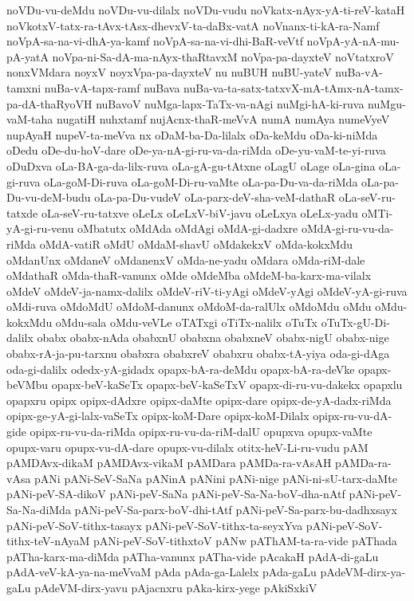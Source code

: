 {noVDu-vu-deMdu
noVDu-vu-dilalx
noVDu-vudu
noVkatx-nAyx-yA-ti-reV-kataH
noVkotxV-tatx-ra-tAvx-tAsx-dhevxV-ta-daBx-vatA
noVnanx-ti-kA-ra-Namf
noVpA-sa-na-vi-dhA-ya-kamf
noVpA-sa-na-vi-dhi-BaR-veVtf
noVpA-yA-nA-mu-pA-yatA
noVpa-ni-Sa-dA-ma-nAyx-thaRtavxM
noVpa-pa-dayxteV
noVtatxroV
nonxVMdara
noyxV
noyxVpa-pa-dayxteV
nu
nuBUH
nuBU-yateV
nuBa-vA-tamxni
nuBa-vA-tapx-ramf
nuBava
nuBa-va-ta-satx-tatxvX-mA-tAmx-nA-tamx-pa-dA-thaRyoVH
nuBavoV
nuMga-lapx-TaTx-va-nAgi
nuMgi-hA-ki-ruva
nuMgu-vaM-taha
nugatiH
nuhxtamf
nujAcnx-thaR-meVvA
numA
numAya
numeVyeV
nupAyaH
nupeV-ta-meVva
nx
oDaM-ba-Da-lilalx
oDa-keMdu
oDa-ki-niMda
oDedu
oDe-du-hoV-dare
oDe-ya-nA-gi-ru-va-da-riMda
oDe-yu-vaM-te-yi-ruva
oDuDxva
oLa-BA-ga-da-lilx-ruva
oLa-gA-gu-tAtxne
oLagU
oLage
oLa-gina
oLa-gi-ruva
oLa-goM-Di-ruva
oLa-goM-Di-ru-vaMte
oLa-pa-Du-va-da-riMda
oLa-pa-Du-vu-deM-budu
oLa-pa-Du-vudeV
oLa-parx-deV-sha-veM-dathaR
oLa-seV-ru-tatxde
oLa-seV-ru-tatxve
oLeLx
oLeLxV-biV-javu
oLeLxya
oLeLx-yadu
oMTi-yA-gi-ru-venu
oMbatutx
oMdAda
oMdAgi
oMdA-gi-dadxre
oMdA-gi-ru-vu-da-riMda
oMdA-vatiR
oMdU
oMdaM-shavU
oMdakekxV
oMda-kokxMdu
oMdanUnx
oMdaneV
oMdanenxV
oMda-ne-yadu
oMdara
oMda-riM-dale
oMdathaR
oMda-thaR-vanunx
oMde
oMdeMba
oMdeM-ba-karx-ma-vilalx
oMdeV
oMdeV-ja-namx-dalilx
oMdeV-riV-ti-yAgi
oMdeV-yAgi
oMdeV-yA-gi-ruva
oMdi-ruva
oMdoMdU
oMdoM-danunx
oMdoM-da-ralUlx
oMdoMdu
oMdu
oMdu-kokxMdu
oMdu-sala
oMdu-veVLe
oTATxgi
oTiTx-nalilx
oTuTx
oTuTx-gU-Di-dalilx
obabx
obabx-nAda
obabxnU
obabxna
obabxneV
obabx-nigU
obabx-nige
obabx-rA-ja-pu-tarxnu
obabxra
obabxreV
obabxru
obabx-tA-yiya
oda-gi-dAga
oda-gi-dalilx
odedx-yA-gidadx
opapx-bA-ra-deMdu
opapx-bA-ra-deVke
opapx-beVMbu
opapx-beV-kaSeTx
opapx-beV-kaSeTxV
opapx-di-ru-vu-dakekx
opapxlu
opapxru
opipx
opipx-dAdxre
opipx-daMte
opipx-dare
opipx-de-yA-dadx-riMda
opipx-ge-yA-gi-lalx-vaSeTx
opipx-koM-Dare
opipx-koM-Dilalx
opipx-ru-vu-dA-gide
opipx-ru-vu-da-riMda
opipx-ru-vu-da-riM-dalU
opupxva
opupx-vaMte
opupx-varu
opupx-vu-dA-dare
opupx-vu-dilalx
otitx-heV-Li-ru-vudu
pAM
pAMDAvx-dikaM
pAMDAvx-vikaM
pAMDara
pAMDa-ra-vAsAH
pAMDa-ra-vAsa
pANi
pANi-SeV-SaNa
pANinA
pANini
pANi-nige
pANi-ni-sU-tarx-daMte
pANi-peV-SA-dikoV
pANi-peV-SaNa
pANi-peV-Sa-Na-boV-dha-nAtf
pANi-peV-Sa-Na-diMda
pANi-peV-Sa-parx-boV-dhi-tAtf
pANi-peV-Sa-parx-bu-dadhxsayx
pANi-peV-SoV-tithx-tasayx
pANi-peV-SoV-tithx-ta-seyxYva
pANi-peV-SoV-tithx-teV-nAyaM
pANi-peV-SoV-tithxtoV
pANw
pAThAM-ta-ra-vide
pAThada
pATha-karx-ma-diMda
pATha-vanunx
pATha-vide
pAcakaH
pAdA-di-gaLu
pAdA-veV-kA-ya-na-meVvaM
pAda
pAda-ga-Lalelx
pAda-gaLu
pAdeVM-dirx-ya-gaLu
pAdeVM-dirx-yavu
pAjacnxru
pAka-kirx-yege
pAkiSxkiV
}
